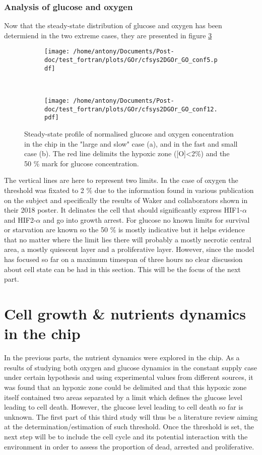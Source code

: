 \documentclass[11pt,a4paper]{article}
\begin{document}
\subsubsection{Analysis of glucose and oxygen}
Now that the steady-state distribution of glucose and oxygen has been determiend in the two extreme cases, they are presented in figure \ref{GO_x}

\begin{figure}[ht!]
	\begin{subfigure}{0.45\textwidth}
	\centering
	\texttt{[image: /home/antony/Documents/Post-doc/test\_fortran/plots/GOr/cfsys2DGOr\_GO\_conf5.pdf]}
	\caption{ \label{G_ctr_conf12}}
	\end{subfigure}
	~~
	\begin{subfigure}{0.45\textwidth}
	\texttt{[image: /home/antony/Documents/Post-doc/test\_fortran/plots/GOr/cfsys2DGOr\_GO\_conf12.pdf]}
		\caption{ \label{Gt_conf12}}
	\end{subfigure}
	\caption{Steady-state profile of normalised glucose and oxygen concentration in the chip in the "large and slow" case (a), and in the fast and small case (b). The red line delimits the hypoxic zone ([O]<2\%) and the 50 \% mark for glucose concentration. \label{GO_x}}
	\end{figure}
	
The vertical lines are here to represent two limits. In the case of oxygen the threshold was fixated to 2 \% due to the information found in various publication on the subject and specifically the results of Waker and collaborators shown in their 2018 poster.\cite{Waker2018} It delinates the cell that should significantly express HIF1-$\alpha$  and HIF2-$\alpha$ and go into growth arrest. For glucose no known limits for survival or starvation are known so the 50 \% is mostly indicative  but it helps evidence that no matter where the limit lies there will probably a mostly necrotic central area, a mostly quiescent layer and a proliferative layer. However, since the model has focused so far on a maximum timespan of three hours no clear discussion about cell state can be had in this section. This will be the focus of the next part.

\section{Cell growth \& nutrients dynamics in the chip}
In the previous parts, the nutrient dynamics were explored in the chip. As a results of studying both oxygen and glucose dynamics in the constant supply case under certain hypothesis and using experimental values from different sources, it was found that an hypoxic zone could be delimited and that this hypoxic zone itself contained two areas separated by a limit which defines the glucose level leading to cell death. However, the glucose level leading to cell death so far is unknown. The first part of this third study will thus be a literature review aiming at the determination/estimation of such threshold. Once the threshold is set, the next step will be to include the cell cycle and its potential interaction with the environment in order to assess the proportion of dead, arrested and proliferative.
\end{document}
